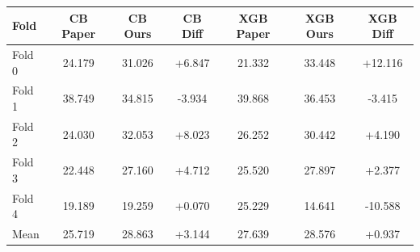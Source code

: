 \begin{tabular}{lcccccc}
\toprule
Fold & CB Paper & CB Ours & CB Diff & XGB Paper & XGB Ours & XGB Diff \\ \midrule
Fold 0 & 24.179 & 31.026 & +6.847 & 21.332 & 33.448 & +12.116 \\
Fold 1 & 38.749 & 34.815 & -3.934 & 39.868 & 36.453 & -3.415 \\
Fold 2 & 24.030 & 32.053 & +8.023 & 26.252 & 30.442 & +4.190 \\
Fold 3 & 22.448 & 27.160 & +4.712 & 25.520 & 27.897 & +2.377 \\
Fold 4 & 19.189 & 19.259 & +0.070 & 25.229 & 14.641 & -10.588 \\
Mean & 25.719 & 28.863 & +3.144 & 27.639 & 28.576 & +0.937 \\
\bottomrule
\end{tabular}
